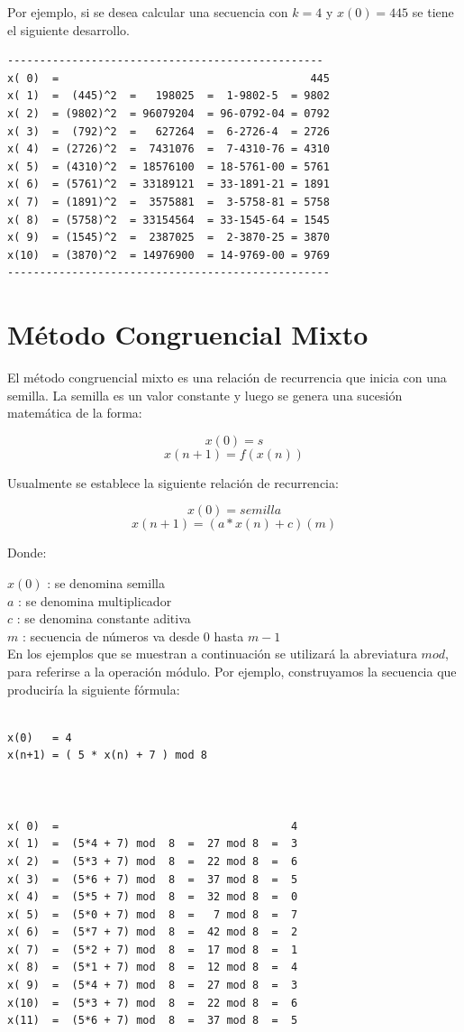 Por ejemplo, si se desea calcular una secuencia con $k=4$ y $x(0) = 445$  se tiene el siguiente desarrollo.

\begin{verbatim}
-------------------------------------------------
x( 0)  =                                       445
x( 1)  =  (445)^2  =   198025  =  1-9802-5  = 9802
x( 2)  = (9802)^2  = 96079204  = 96-0792-04 = 0792
x( 3)  =  (792)^2  =   627264  =  6-2726-4  = 2726
x( 4)  = (2726)^2  =  7431076  =  7-4310-76 = 4310
x( 5)  = (4310)^2  = 18576100  = 18-5761-00 = 5761
x( 6)  = (5761)^2  = 33189121  = 33-1891-21 = 1891
x( 7)  = (1891)^2  =  3575881  =  3-5758-81 = 5758
x( 8)  = (5758)^2  = 33154564  = 33-1545-64 = 1545
x( 9)  = (1545)^2  =  2387025  =  2-3870-25 = 3870
x(10)  = (3870)^2  = 14976900  = 14-9769-00 = 9769
--------------------------------------------------
\end{verbatim}



\section{Método Congruencial Mixto}

El método congruencial mixto es una relación de recurrencia que inicia con una semilla. La semilla es un valor constante y luego se genera una sucesión matemática de la forma:

$$x(0)   = s$$ 
$$x(n+1) = f( x(n) )$$


Usualmente se establece la siguiente relación de recurrencia:

$$x(0)   = semilla$$
$$x(n+1) = ( a * x(n) + c ) (m)$$

Donde:

$x(0)$ : se denomina semilla\\
$a$    : se denomina multiplicador\\ 
$c$    : se denomina constante aditiva\\
$m$    : secuencia de números va desde $0$ hasta $m-1$\\

En los ejemplos que se muestran a continuación se utilizará la abreviatura $mod$, para referirse a la operación módulo. Por ejemplo, construyamos la secuencia que produciría la siguiente fórmula:
\begin{verbatim}

x(0)   = 4
x(n+1) = ( 5 * x(n) + 7 ) mod 8



x( 0)  =                                    4
x( 1)  =  (5*4 + 7) mod  8  =  27 mod 8  =  3
x( 2)  =  (5*3 + 7) mod  8  =  22 mod 8  =  6
x( 3)  =  (5*6 + 7) mod  8  =  37 mod 8  =  5
x( 4)  =  (5*5 + 7) mod  8  =  32 mod 8  =  0
x( 5)  =  (5*0 + 7) mod  8  =   7 mod 8  =  7
x( 6)  =  (5*7 + 7) mod  8  =  42 mod 8  =  2
x( 7)  =  (5*2 + 7) mod  8  =  17 mod 8  =  1
x( 8)  =  (5*1 + 7) mod  8  =  12 mod 8  =  4
x( 9)  =  (5*4 + 7) mod  8  =  27 mod 8  =  3
x(10)  =  (5*3 + 7) mod  8  =  22 mod 8  =  6
x(11)  =  (5*6 + 7) mod  8  =  37 mod 8  =  5
\end{verbatim}


